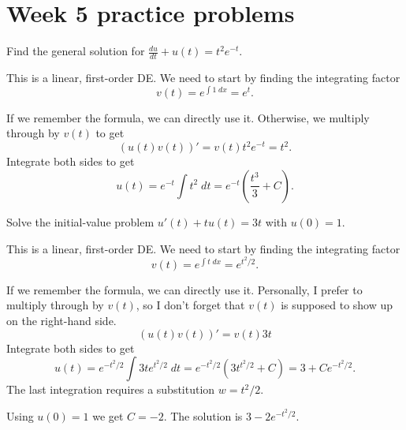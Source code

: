 \documentclass[../main.tex]{subfiles}
\begin{document}
\section{Week 5 practice problems}

\begin{exercise}
  Find the general solution for \(\frac{du}{dt} + u(t) = t^{2}e^{-t}\).

  \begin{solution}
    This is a linear, first-order DE. We need to start by finding the integrating factor
    \[
      v(t) = e^{\int 1 \;dx} = e^{t}.
    \]

    If we remember the formula, we can directly use it. Otherwise, we multiply through by \(v(t)\) to get
    \[
      (u(t) v(t))' = v(t) t^{2} e^{-t} = t^{2}.
    \]
    Integrate both sides to get
    \[
      u(t) = e^{-t} \int t^{2} \;dt = e^{-t}\left( \frac{t^{3}}{3} + C \right).
    \]

  \end{solution}
\end{exercise}

\begin{exercise}
  Solve the initial-value problem \(u'(t) + tu(t) = 3t\) with \(u(0) = 1\).  

  \begin{solution}
    This is a linear, first-order DE. We need to start by finding the integrating factor
    \[
      v(t) = e^{\int t \;dx} = e^{t^{2}/2}.
    \]

    If we remember the formula, we can directly use it. Personally, I prefer to multiply through by \(v(t)\), so I don't forget that \(v(t)\) is supposed to show up on the right-hand side.
    \[
      (u(t) v(t))' = v(t) 3t
    \]
    Integrate both sides to get
    \[
      u(t) = e^{-t^{2}/2} \int 3t e^{t^{2}/2} \;dt = e^{-t^{2}/2}\left( 3t^{t^{2}/2} + C\right) = 3 + Ce^{-t^{2}/2}.
    \]
    The last integration requires a substitution \(w = t^{2}/2\).


    Using \(u(0) = 1\) we get \(C = -2\). The solution is \(3 - 2 e^{-t^{2}/2}\).

  \end{solution}
\end{exercise}
\end{document}
